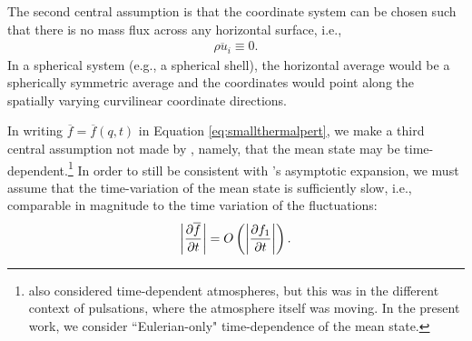 \documentclass[12pt]{article}
\begin{document}
	The second central assumption is that the coordinate system can be chosen such that there is no mass flux across any horizontal surface, i.e.,
	\begin{align}\label{eq:nomassflux}
		\overline{\rho u_i}\equiv0.
	\end{align}
	In a spherical system (e.g., a spherical shell), the horizontal average would be a spherically symmetric average and the coordinates would point along the spatially varying curvilinear coordinate directions. 

	In writing $\overline{f}=\overline{f}(q,t)$ in Equation \eqref{eq:smallthermalpert}, we make a third central assumption not made by \citet{Gough1969}, namely, that the mean state may be time-dependent.\footnote{\citet{Gough1969} also considered time-dependent atmospheres, but this was in the different context of pulsations, where the atmosphere itself was moving. In the present work, we consider ``Eulerian-only" time-dependence of the mean state.} In order to still be consistent with \citet{Gough1969}'s asymptotic expansion, we must assume that the time-variation of the mean state is sufficiently slow, i.e., comparable in magnitude to the time variation of the fluctuations:
\begin{align}\label{eq:meanvariationslow}
	\left|\frac{\partial\overline{f}}{\partial t}\right| = O\left(\left|\frac{\partial f_1}{\partial t}\right|\right).
\end{align}
\end{document}

